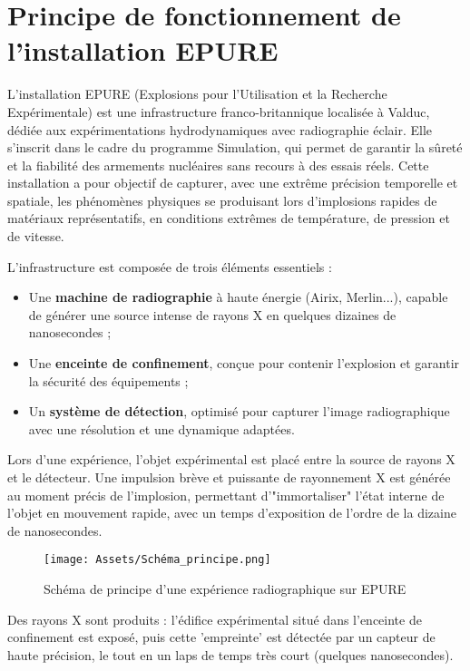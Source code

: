 \documentclass[12pt,a4paper]{report}
\begin{document}
\section{Principe de fonctionnement de l'installation EPURE}
L’installation EPURE (Explosions pour l’Utilisation et la Recherche Expérimentale) est une infrastructure franco-britannique localisée à Valduc, dédiée aux expérimentations hydrodynamiques avec radiographie éclair. Elle s’inscrit dans le cadre du programme Simulation, qui permet de garantir la sûreté et la fiabilité des armements nucléaires sans recours à des essais réels. Cette installation a pour objectif de capturer, avec une extrême précision temporelle et spatiale, les phénomènes physiques se produisant lors d’implosions rapides de matériaux représentatifs, en conditions extrêmes de température, de pression et de vitesse.

L’infrastructure est composée de trois éléments essentiels :
\begin{itemize}
\item Une \textbf{machine de radiographie} à haute énergie (Airix, Merlin...), capable de générer une source intense de rayons X en quelques dizaines de nanosecondes ;
\item Une \textbf{enceinte de confinement}, conçue pour contenir l’explosion et garantir la sécurité des équipements ;
\item Un \textbf{système de détection}, optimisé pour capturer l’image radiographique avec une résolution et une dynamique adaptées.
\end{itemize}

Lors d’une expérience, l’objet expérimental est placé entre la source de rayons X et le détecteur. Une impulsion brève et puissante de rayonnement X est générée au moment précis de l’implosion, permettant d’"immortaliser" l’état interne de l’objet en mouvement rapide, avec un temps d’exposition de l’ordre de la dizaine de nanosecondes.

\begin{figure}[H]
    \centering
    \texttt{[image: Assets/Schéma\_principe.png]}
    \caption{Schéma de principe d’une expérience radiographique sur EPURE}
    \label{fig:images}
\end{figure}

Des rayons X sont produits : l’édifice expérimental situé dans l’enceinte de confinement est exposé, puis cette 'empreinte' est détectée par un capteur de haute précision, le tout en un laps de temps très court (quelques nanosecondes).
\end{document}
